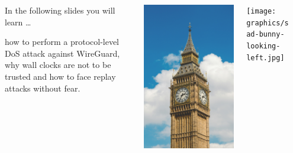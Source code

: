 \begin{frame}[light]{}
\begin{columns}[fullwidth]
\begin{column}{.35\linewidth}
        In the following slides you will learn …
        \par\vspace{1.5em}
        how to perform a protocol-level DoS attack against WireGuard,
        why wall clocks are not to be trusted and how to face replay
        attacks without fear.
    \end{column}
    \begin{column}{.20\linewidth}
      \includegraphics[width=\linewidth]{graphics/big-ben.jpg}
      \vspace{0.4cm}
    \end{column}
    \begin{column}{.20\linewidth}
      \vspace{1.6cm}
      \texttt{[image: graphics/sad-bunny-looking-left.jpg]}
    \end{column}

    \begin{column}{.1\linewidth}
    \end{column}
  \end{columns}
\end{frame}


